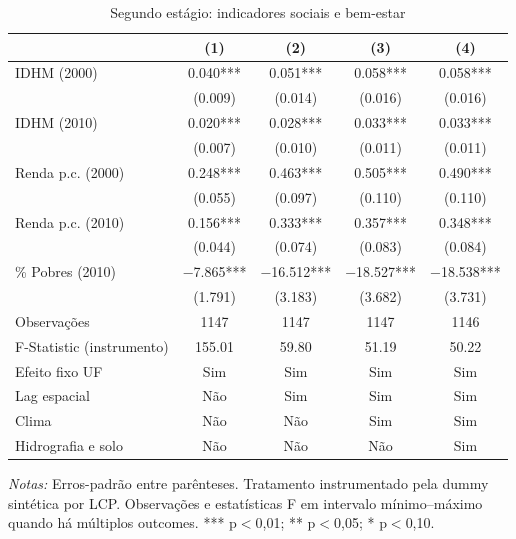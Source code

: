\documentclass[12pt,a4paper]{article}
\begin{document}
\begin{table}[!htbp]
\centering
\scriptsize
\setlength{\tabcolsep}{3.5pt}
\renewcommand{\arraystretch}{0.80}
\caption{Segundo estágio: indicadores sociais e bem-estar}
\label{tab:segundo_estagio_soc}
\begin{tabular}{lcccc}
\toprule
& (1) & (2) & (3) & (4) \\
\midrule
IDHM (2000) & \num{0.040}*** & \num{0.051}*** & \num{0.058}*** & \num{0.058}*** \\
& (\num{0.009}) & (\num{0.014}) & (\num{0.016}) & (\num{0.016}) \\
IDHM (2010) & \num{0.020}*** & \num{0.028}*** & \num{0.033}*** & \num{0.033}*** \\
& (\num{0.007}) & (\num{0.010}) & (\num{0.011}) & (\num{0.011}) \\
Renda p.c. (2000) & \num{0.248}*** & \num{0.463}*** & \num{0.505}*** & \num{0.490}*** \\
& (\num{0.055}) & (\num{0.097}) & (\num{0.110}) & (\num{0.110}) \\
Renda p.c. (2010) & \num{0.156}*** & \num{0.333}*** & \num{0.357}*** & \num{0.348}*** \\
& (\num{0.044}) & (\num{0.074}) & (\num{0.083}) & (\num{0.084}) \\
\% Pobres (2010) & \num{-7.865}*** & \num{-16.512}*** & \num{-18.527}*** & \num{-18.538}*** \\
& (\num{1.791}) & (\num{3.183}) & (\num{3.682}) & (\num{3.731}) \\
\midrule
Observações & 1147 & 1147 & 1147 & 1146 \\
F-Statistic (instrumento) & 155.01 & 59.80 & 51.19 & 50.22 \\
Efeito fixo UF & Sim & Sim & Sim & Sim \\
Lag espacial & Não & Sim & Sim & Sim \\
Clima & Não & Não & Sim & Sim \\
Hidrografia e solo & Não & Não & Não & Sim \\
\bottomrule
\end{tabular}
\begin{minipage}{0.95\textwidth}
\scriptsize \textit{Notas:} Erros-padrão entre parênteses. Tratamento instrumentado pela dummy sintética por LCP. Observações e estatísticas F em intervalo mínimo--máximo quando há múltiplos outcomes. *** p$<$0,01; ** p$<$0,05; * p$<$0,10.
\end{minipage}
\end{table}
\end{document}
